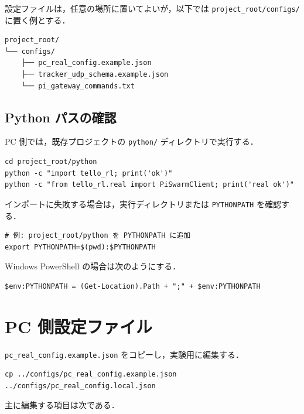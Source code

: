 設定ファイルは，任意の場所に置いてよいが，以下では \texttt{project\_root/configs/} に置く例とする．

\begin{lstlisting}
project_root/
└── configs/
    ├── pc_real_config.example.json
    ├── tracker_udp_schema.example.json
    └── pi_gateway_commands.txt
\end{lstlisting}

\subsection{Python パスの確認}

PC 側では，既存プロジェクトの \texttt{python/} ディレクトリで実行する．

\begin{lstlisting}
cd project_root/python
python -c "import tello_rl; print('ok')"
python -c "from tello_rl.real import PiSwarmClient; print('real ok')"
\end{lstlisting}

インポートに失敗する場合は，実行ディレクトリまたは \texttt{PYTHONPATH} を確認する．

\begin{lstlisting}
# 例: project_root/python を PYTHONPATH に追加
export PYTHONPATH=$(pwd):$PYTHONPATH
\end{lstlisting}

Windows PowerShell の場合は次のようにする．

\begin{lstlisting}
$env:PYTHONPATH = (Get-Location).Path + ";" + $env:PYTHONPATH
\end{lstlisting}

\section{PC 側設定ファイル}
\label{sec:pc_config}

\texttt{pc\_real\_config.example.json} をコピーし，実験用に編集する．

\begin{lstlisting}
cp ../configs/pc_real_config.example.json ../configs/pc_real_config.local.json
\end{lstlisting}

主に編集する項目は次である．

